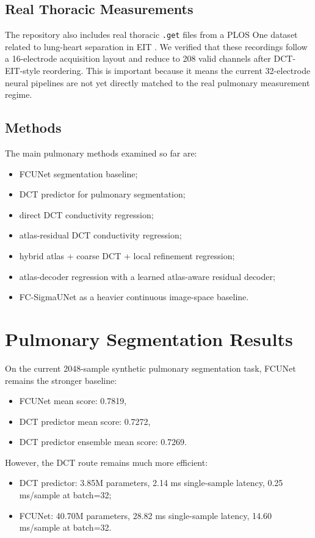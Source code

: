 \documentclass[11pt,a4paper]{article}
\begin{document}
\subsection{Real Thoracic Measurements}
The repository also includes real thoracic \texttt{.get} files from a PLOS One dataset related to lung-heart separation in EIT \cite{li2021thorax}. We verified that these recordings follow a 16-electrode acquisition layout and reduce to 208 valid channels after DCT-EIT-style reordering. This is important because it means the current 32-electrode neural pipelines are not yet directly matched to the real pulmonary measurement regime.

\subsection{Methods}
The main pulmonary methods examined so far are:
\begin{itemize}[leftmargin=1.5em]
    \item FCUNet segmentation baseline;
    \item DCT predictor for pulmonary segmentation;
    \item direct DCT conductivity regression;
    \item atlas-residual DCT conductivity regression;
    \item hybrid atlas + coarse DCT + local refinement regression;
    \item atlas-decoder regression with a learned atlas-aware residual decoder;
    \item FC-SigmaUNet as a heavier continuous image-space baseline.
\end{itemize}

\section{Pulmonary Segmentation Results}
On the current 2048-sample synthetic pulmonary segmentation task, FCUNet remains the stronger baseline:
\begin{itemize}[leftmargin=1.5em]
    \item FCUNet mean score: 0.7819,
    \item DCT predictor mean score: 0.7272,
    \item DCT predictor ensemble mean score: 0.7269.
\end{itemize}

However, the DCT route remains much more efficient:
\begin{itemize}[leftmargin=1.5em]
    \item DCT predictor: 3.85M parameters, 2.14 ms single-sample latency, 0.25 ms/sample at batch=32;
    \item FCUNet: 40.70M parameters, 28.82 ms single-sample latency, 14.60 ms/sample at batch=32.
\end{itemize}
\end{document}
